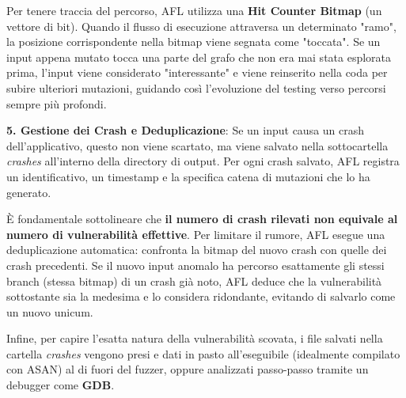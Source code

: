 Per tenere traccia del percorso, AFL utilizza una \textbf{Hit Counter Bitmap} (un 
vettore di bit). Quando il flusso di esecuzione attraversa un determinato "ramo", la 
posizione corrispondente nella bitmap viene segnata come "toccata". Se un input 
appena mutato tocca una parte del grafo che non era mai stata esplorata prima, 
l'input viene considerato "interessante" e viene reinserito nella coda per subire 
ulteriori mutazioni, guidando così l'evoluzione del testing verso percorsi sempre 
più profondi.

\textbf{5. Gestione dei Crash e Deduplicazione}: Se un input causa un crash 
dell'applicativo, questo non viene scartato, ma viene salvato nella sottocartella 
\textit{crashes} all'interno della directory di output. Per ogni crash salvato, AFL 
registra un identificativo, un timestamp e la specifica catena di mutazioni che lo 
ha generato.

È fondamentale sottolineare che \textbf{il numero di crash rilevati non equivale al numero 
di vulnerabilità effettive}. Per limitare il rumore, AFL esegue una deduplicazione 
automatica: confronta la bitmap del nuovo crash con quelle dei crash precedenti. Se 
il nuovo input anomalo ha percorso esattamente gli stessi branch (stessa bitmap) di 
un crash già noto, AFL deduce che la vulnerabilità sottostante sia la medesima e lo 
considera ridondante, evitando di salvarlo come un nuovo unicum.

Infine, per capire l'esatta natura della vulnerabilità scovata, i file salvati nella 
cartella \textit{crashes} vengono presi e dati in pasto all'eseguibile (idealmente 
compilato con ASAN) al di fuori del fuzzer, oppure analizzati passo-passo tramite un 
debugger come \textbf{GDB}.